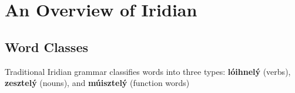 \chapter{An Overview of Iridian}

\section{Word Classes}
Traditional Iridian grammar classifies words into three types: \textbf{lóihnelý} (verbs), \textbf{zesztelý} (nouns), and \textbf{múisztelý} (function words)